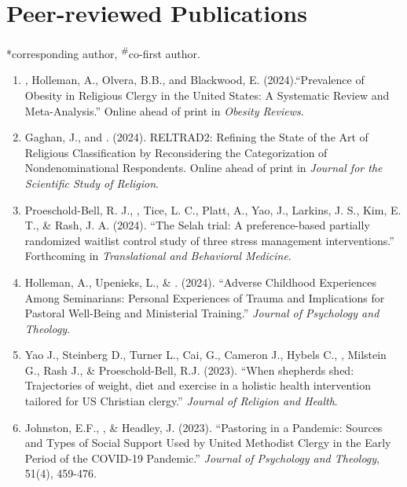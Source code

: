 \newcommand{\Revision}{\textit{under revision}}
\newcommand{\CS}{*} %
\newcommand{\CF}{\textsuperscript{\#}} %

\section*{Peer-reviewed Publications}
\CS corresponding author, \CF co-first author.

\begin{enumerate}

\item \Eagle, Holleman, A., Olvera, B.B., and Blackwood, E. (2024).``Prevalence of Obesity in Religious Clergy in the United States: A Systematic Review and Meta-Analysis.'' Online ahead of print in \textit{Obesity Reviews}. 

\item Gaghan, J., and \Eagle. (2024). RELTRAD2: Refining the State of the Art of Religious Classification by Reconsidering the Categorization of Nondenominational Respondents. Online ahead of print in \textit{Journal for the Scientific Study of Religion}. 

\item Proeschold-Bell, R. J., \Eagle, Tice, L. C., Platt, A., Yao, J., Larkins, J. S., Kim, E. T., \& Rash, J. A. (2024). ``The Selah trial: A preference-based partially randomized waitlist control study of three stress management interventions.''  Forthcoming in \textit{Translational and Behavioral Medicine}.  

\item Holleman, A., Upenieks, L., \& \Eagle. (2024). ``Adverse Childhood Experiences Among Seminarians: Personal Experiences of Trauma and Implications for Pastoral Well-Being and Ministerial Training.'' \textit{Journal of Psychology and Theology}. 

\item Yao J., Steinberg D., Turner L., Cai, G., Cameron J., Hybels C., \Eagle, Milstein G., Rash J., \& Proeschold-Bell, R.J. (2023). ``When shepherds shed: Trajectories of weight, diet and exercise in a holistic health intervention tailored for US Christian clergy.'' \textit{Journal of Religion and Health}. 

\item Johnston, E.F., \Eagle, \& Headley, J. (2023). ``Pastoring in a Pandemic: Sources and Types of Social Support Used by United Methodist Clergy in the Early Period of the COVID-19 Pandemic.'' \textit{Journal of Psychology and Theology}, 51(4), 459-476. 
	

\end{enumerate}
